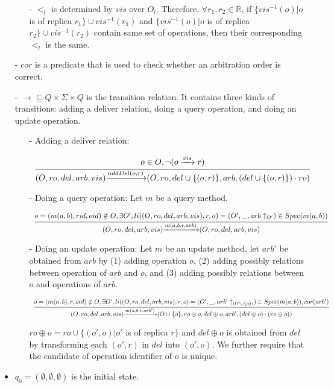 \begin{itemize}
\begin{itemize}
    \item[-] $<_l$ is determined by $vis$ over $O_l$. Therefore, $\forall r_1,r_2 \in \mathbb{R}$, if $\{ vis^{-1}(o) \vert o$ is of replica $r_1 \} \cup vis^{-1}(r_1)$ and $\{ vis^{-1}(o) \vert o$ is of replica $r_2 \} \cup vis^{-1}(r_2)$ contain same set of operations, then their corresponding $<_l$ is the same.
    \end{itemize}

\item[-] $cor$ is a predicate that is used to check whether an arbitration order is correct.

\item[-] $\rightarrow \subseteq Q \times \Sigma \times Q$ is the transition relation. It contains three kinds of transitions: adding a deliver relation, doing a query operation, and doing an update operation.

    \begin {itemize}
    \item[-] Adding a deliver relation:

     $\begin{array}{l c} \bigfrac{o \in O, \neg(o \xrightarrow{vis} r)} {(O,ro,del,arb,vis) {\xrightarrow{addDel(o,r)}} (O,ro,del \cup \{ (o,r) \},arb,(del \cup \{ (o,r) \}) \cdot ro)} \end{array}$

    \item[-] Doing a query operation: Let $m$ be a query method.

     $\begin{array}{l c} \bigfrac{ o=(m(a,b),rid,oid) \notin O, \exists O', li((O,ro,del,arb,vis),r,o) = (O',\_,arb \uparrow_{O'}) \in Spec(m(a,b))} {(O,ro,del,arb,vis) {\xrightarrow{m(a,b,r,arb)}} (O,ro,del,arb,vis)}  \end{array}$

     \item[-] Doing an update operation: Let $m$ be an update method, {\color {red}let $arb'$ be obtained from $arb$ by (1) adding operation $o$, (2) adding possibly relations between operation of $arb$ and $o$, and (3) adding possibly relations between $o$ and operations of $arb$.}

     $\begin{array}{l c} \bigfrac{o = (m(a,b),r,oid) \notin O, \exists O', li((O,ro,del,arb,vis),r,o) = (O',\_,arb' \uparrow_{(O' \cup \{ o \})}) \in Spec(m(a,b)),cor(arb')} {(O,ro,del,arb,vis) {\xrightarrow{m(a,b,r,arb')}} (O \cup \{ o \},ro \oplus o ,del \oplus o,arb',(del \oplus o) \cdot (ro \oplus o))}  \end{array}$

     $ro \oplus o = ro \cup \{ (o',o) \vert o'$ is of replica $r \}$ and $del \oplus o$ is obtained from $del$ by transforming each $(o',r)$ in $del$ into $(o',o)$. We further require that the candidate of operation identifier of $o$ is unique.
    \end{itemize}

\item[-] $q_0=(\emptyset,\emptyset,\emptyset)$ is the initial state.
\end{itemize} 

